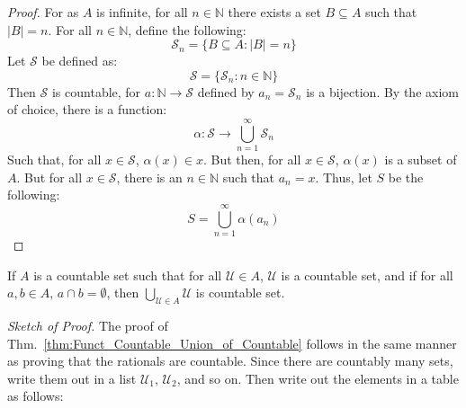         \begin{proof}
            For as $A$ is infinite, for all $n\in\mathbb{N}$
            there exists a set $B\subseteq{A}$ such that
            $|B|=n$. For all $n\in\mathbb{N}$,
            define the following:
            \begin{equation}
                \mathcal{S}_{n}=\{B\subseteq{A}:|B|=n\}
            \end{equation}
            Let $\mathcal{S}$ be defined as:
            \begin{equation}
                \mathcal{S}=\{\mathcal{S}_{n}:n\in\mathbb{N}\}
            \end{equation}
            Then $\mathcal{S}$ is countable, for
            $a:\mathbb{N}\rightarrow\mathcal{S}$ defined
            by $a_{n}=\mathcal{S}_{n}$ is a bijection.
            By the axiom of choice, there is a function:
            \begin{equation}
                \alpha:\mathcal{S}\rightarrow
                \bigcup_{n=1}^{\infty}\mathcal{S}_{n}
            \end{equation}
            Such that, for all $x\in\mathcal{S}$,
            $\alpha(x)\in{x}$. But then, for all
            $x\in\mathcal{S}$, $\alpha(x)$ is a subset
            of $A$. But for all $x\in\mathcal{S}$, there
            is an $n\in\mathbb{N}$ such that
            $a_{n}=x$. Thus, let $S$ be the following:
            \begin{equation}
                S=\bigcup_{n=1}^{\infty}\alpha(a_{n})
            \end{equation}
        \end{proof}
        \begin{theorem}
            \label{thm:Funct_Countable_Union_of_Countable}
            If $A$ is a countable set such that for all
            $\mathcal{U}\in{A}$, $\mathcal{U}$ is a
            countable set, and if for all $a,b\in{A}$,
            $a\cap{b}=\emptyset$, then
            $\bigcup_{\mathcal{U}\in{A}}\mathcal{U}$
            is countable set.
        \end{theorem}
        \textit{Sketch of Proof.} The proof of
        Thm.~\ref{thm:Funct_Countable_Union_of_Countable}
        follows in the same manner
        as proving that the rationals are countable. Since
        there are countably many sets, write them out in
        a list $\mathcal{U}_{1}$, $\mathcal{U}_{2}$, and
        so on. Then write out the elements in a table as
        follows:
